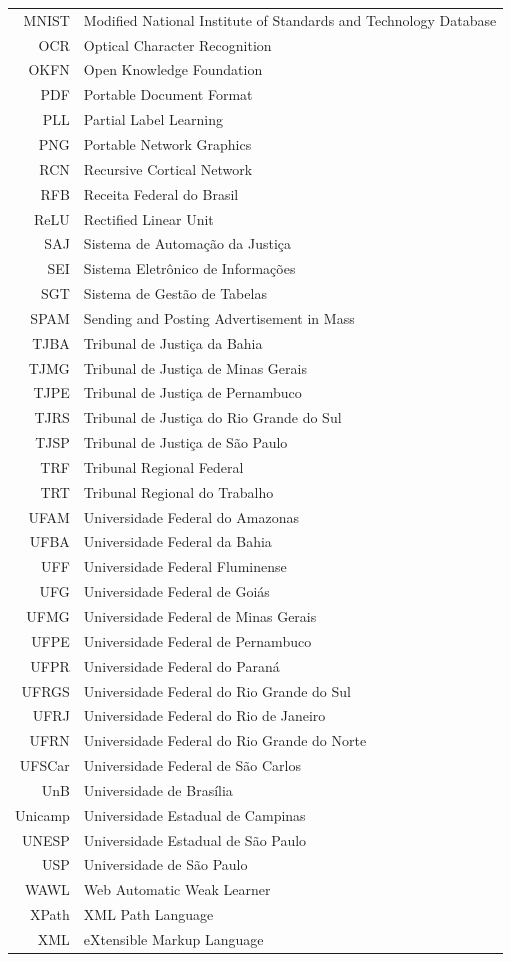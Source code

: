 \documentclass[12pt,twoside,brazilian]{book}
\begin{document}
\begin{tabular}{rl}
   MNIST & Modified National Institute of Standards and Technology Database\\
   OCR & Optical Character Recognition\\
   OKFN & Open Knowledge Foundation\\
   PDF & Portable Document Format\\
   PLL & Partial Label Learning\\
   PNG & Portable Network Graphics\\
   RCN & Recursive Cortical Network\\
   RFB & Receita Federal do Brasil\\
   ReLU & Rectified Linear Unit\\
   SAJ & Sistema de Automação da Justiça\\
   SEI & Sistema Eletrônico de Informações\\
   SGT & Sistema de Gestão de Tabelas\\
   SPAM & Sending and Posting Advertisement in Mass\\
   TJBA & Tribunal de Justiça da Bahia\\
   TJMG & Tribunal de Justiça de Minas Gerais\\
   TJPE & Tribunal de Justiça de Pernambuco\\
   TJRS & Tribunal de Justiça do Rio Grande do Sul\\
   TJSP & Tribunal de Justiça de São Paulo\\
   TRF & Tribunal Regional Federal\\
   TRT & Tribunal Regional do Trabalho\\
   UFAM & Universidade Federal do Amazonas\\
   UFBA & Universidade Federal da Bahia\\
   UFF & Universidade Federal Fluminense\\
   UFG & Universidade Federal de Goiás\\
   UFMG & Universidade Federal de Minas Gerais\\
   UFPE & Universidade Federal de Pernambuco\\
   UFPR & Universidade Federal do Paraná\\
   UFRGS & Universidade Federal do Rio Grande do Sul\\
   UFRJ & Universidade Federal do Rio de Janeiro\\
   UFRN & Universidade Federal do Rio Grande do Norte\\
   UFSCar & Universidade Federal de São Carlos\\
   UnB & Universidade de Brasília\\
   Unicamp & Universidade Estadual de Campinas\\
   UNESP & Universidade Estadual de São Paulo\\
   USP & Universidade de São Paulo\\
   WAWL & Web Automatic Weak Learner\\
   XPath & XML Path Language\\
   XML & eXtensible Markup Language
\end{tabular}
\end{document}
